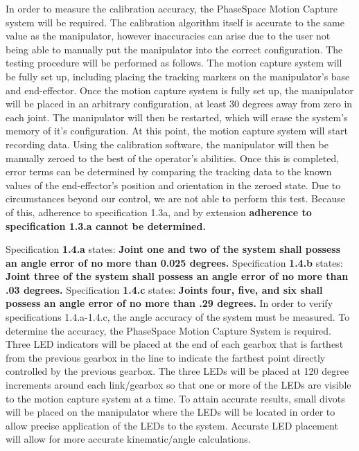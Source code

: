 In order to measure the calibration accuracy, the PhaseSpace Motion Capture system will be required. The calibration algorithm itself is accurate to the same value as the manipulator, however inaccuracies can arise due to the user not being able to manually put the manipulator into the correct configuration.  The testing procedure will be performed as follows. The motion capture system will be fully set up, including placing the tracking markers on the manipulator’s base and end-effector. Once the motion capture system is fully set up, the manipulator will be placed in an arbitrary configuration, at least 30 degrees away from zero in each joint. The manipulator will then be restarted, which will erase the system’s memory of it’s configuration. At this point, the motion capture system will start recording data. Using the calibration software, the manipulator will then be manually zeroed to the best of the operator’s abilities. Once this is completed, error terms can be determined by comparing the tracking data to the known values of the end-effector’s position and orientation in the zeroed state. Due to circumstances beyond our control, we are not able to perform this test. Because of this, adherence to specification 1.3a, and by extension \textbf{adherence to specification 1.3.a cannot be determined.}


Specification \textbf{1.4.a} states: \textbf{Joint one and two of the system shall possess an angle error of no more than 0.025 degrees.} Specification \textbf{1.4.b} states: \textbf{Joint three of the system shall possess an angle error of no more than .03 degrees.} Specification \textbf{1.4.c} states: \textbf{Joints four, five, and six shall possess an angle error of no more than .29 degrees.} In order to verify specifications 1.4.a-1.4.c, the angle accuracy of the system must be measured. To determine the accuracy, the PhaseSpace Motion Capture System is required. Three LED indicators will be placed at the end of each gearbox that is farthest from the previous gearbox in the line to indicate the farthest point directly controlled by the previous gearbox. The three LEDs will be placed at 120 degree increments around each link/gearbox so that one or more of the LEDs are visible to the motion capture system at a time. To attain accurate results, small divots will be placed on the manipulator where the LEDs will be located in order to allow precise application of the LEDs to the system. Accurate LED placement will allow for more accurate kinematic/angle calculations.

